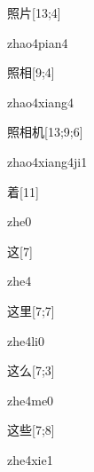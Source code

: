 \begin{verbete}{照片}[13;4]
\begin{pronuncia}{zhao4pian4}
\end{pronuncia}
\end{verbete}

\begin{verbete}{照相}[9;4]
\begin{pronuncia}{zhao4xiang4}
\end{pronuncia}
\end{verbete}

\begin{verbete}{照相机}[13;9;6]
\begin{pronuncia}{zhao4xiang4ji1}
\end{pronuncia}
\end{verbete}

\begin{verbete}[zhe0]{着}[11]
\begin{pronuncia}{zhe0}
\end{pronuncia}
\end{verbete}

\begin{verbete}[zhe4]{这}[7]
\begin{pronuncia}{zhe4}
\end{pronuncia}
\end{verbete}

\begin{verbete}[zhe4li0]{这里}[7;7]
\begin{pronuncia}{zhe4li0}
\end{pronuncia}
\end{verbete}

\begin{verbete}[zhe4me0]{这么}[7;3]
\begin{pronuncia}{zhe4me0}
\end{pronuncia}
\end{verbete}

\begin{verbete}{这些}[7;8]
\begin{pronuncia}{zhe4xie1}
\end{pronuncia}
\end{verbete}

